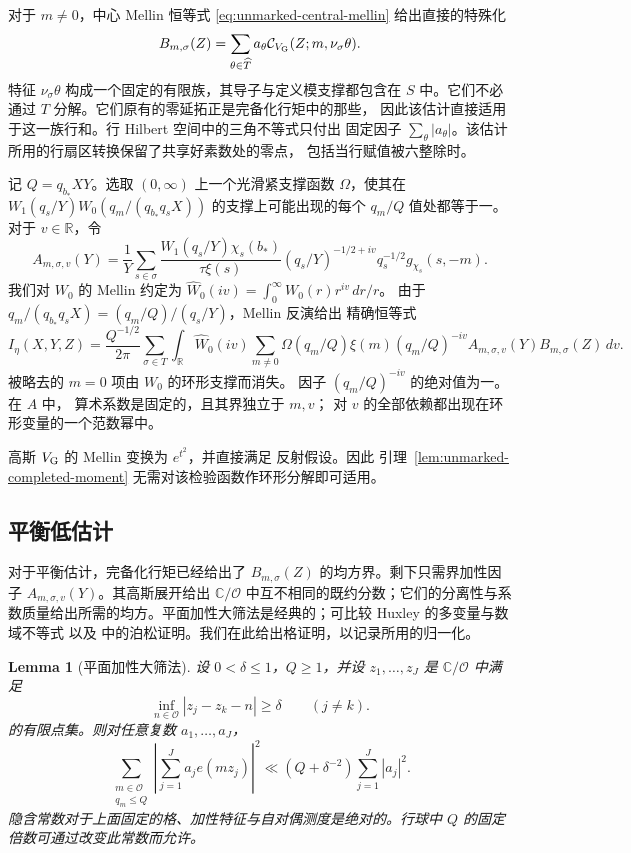 \documentclass[11pt,a4paper]{article}
\numberwithin{equation}{section}
\numberwithin{figure}{section}
\newtheorem{lemma}[theorem]{Lemma}
\theoremstyle{definition}
\theoremstyle{remark}
\begin{document}
对于 $m\ne0$，中心 Mellin 恒等式
\eqref{eq:unmarked-central-mellin} 给出直接的特殊化
\[
 B_{m,\sigma}(Z)=\sum_{\theta\in\widehat T}a_\theta
       \mathcal C_{V_{\rm G}}(Z;m,\nu_\sigma\theta).
\]
特征 $\nu_\sigma\theta$ 构成一个固定的有限族，其导子与定义模支撑都包含在
$S$ 中。它们不必通过 $T$ 分解。它们原有的零延拓正是完备化行矩中的那些，
因此该估计直接适用于这一族行和。行 Hilbert 空间中的三角不等式只付出
固定因子 $\sum_\theta|a_\theta|$。该估计所用的行扇区转换保留了共享好素数处的零点，
包括当行赋值被六整除时。

记 $Q=q_{b_*}XY$。选取 $(0,\infty)$ 上一个光滑紧支撑函数
$\Omega$，使其在
$W_1(q_s/Y)W_0(q_m/(q_{b_*}q_sX))$ 的支撑上可能出现的每个 $q_m/Q$ 值处都等于一。
对于 $v\in\mathbb R$，令
\[
 A_{m,\sigma,v}(Y)=\frac1Y\sum_{s\in\sigma}
 \frac{W_1(q_s/Y)\chi_s(b_*)}{\tau\xi(s)}
 (q_s/Y)^{-1/2+iv}q_s^{-1/2}g_{\chi_s}(s,-m).
\]
我们对 $W_0$ 的 Mellin 约定为
$\widehat W_0(iv)=\int_0^\infty W_0(r)r^{iv}\,dr/r$。
由于
$q_m/(q_{b_*}q_sX)=(q_m/Q)/(q_s/Y)$，Mellin 反演给出
精确恒等式
\begin{equation}\label{eq:low-separated}
 I_\eta(X,Y,Z)=\frac{Q^{-1/2}}{2\pi}
 \sum_{\sigma\in T}\int_{\mathbb R}\widehat W_0(iv)
 \sum_{m\ne0}\Omega(q_m/Q)\xi(m)(q_m/Q)^{-iv}
                 A_{m,\sigma,v}(Y)B_{m,\sigma}(Z)\,dv.
\end{equation}
被略去的 $m=0$ 项由 $W_0$ 的环形支撑而消失。
因子 $(q_m/Q)^{-iv}$ 的绝对值为一。在 $A$ 中，
算术系数是固定的，且其界独立于 $m,v$；
对 $v$ 的全部依赖都出现在环形变量的一个范数幂中。

高斯 $V_{\rm G}$ 的 Mellin 变换为 $e^{t^2}$，并直接满足
反射假设。因此
引理~\ref{lem:unmarked-completed-moment} 无需对该检验函数作环形分解即可适用。

\subsection{平衡低估计}对于平衡估计，完备化行矩已经给出了 $B_{m,\sigma}(Z)$ 的均方界。剩下只需界加性因子 $A_{m,\sigma,v}(Y)$。其高斯展开给出 $\mathbb C/\mathcal O$ 中互不相同的既约分数；它们的分离性与系数质量给出所需的均方。平面加性大筛法是经典的；可比较 Huxley 的多变量与数域不等式 \cite{Huxley} 以及 \cite[Section~3, Theorem~3]{BaierBansal} 中的泊松证明。我们在此给出格证明，以记录所用的归一化。

\begin{lemma}[平面加性大筛法]
\label{lem:planar-additive-sieve}
设 $0<\delta\le1$，$Q\ge1$，并设 $z_1,\ldots,z_J$ 是 $\mathbb C/\mathcal O$ 中满足
\[
 \inf_{n\in\mathcal O}|z_j-z_k-n|\ge\delta
 \qquad(j\ne k).
\]
的有限点集。则对任意复数 $a_1,\ldots,a_J$，
\[
 \sum_{\substack{m\in\mathcal O\\q_m\le Q}}
 \left|\sum_{j=1}^J a_j e(mz_j)\right|^2
 \ll (Q+\delta^{-2})\sum_{j=1}^J|a_j|^2.
\]
隐含常数对于上面固定的格、加性特征与自对偶测度是绝对的。行球中 $Q$ 的固定倍数可通过改变此常数而允许。
\end{lemma}
\end{document}
